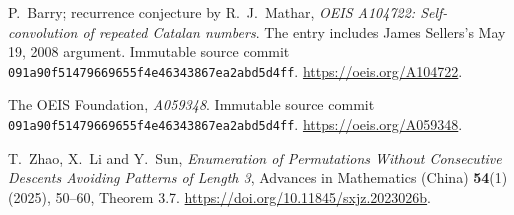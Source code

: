 P.~Barry; recurrence conjecture by R.~J.~Mathar,
\emph{OEIS A104722: Self-convolution of repeated Catalan numbers}.
The entry includes James Sellers's May 19, 2008 argument.
Immutable source commit
\texttt{091a90f51479669655f4e46343867ea2abd5d4ff}.
\url{https://oeis.org/A104722}.

The OEIS Foundation, \emph{A059348}.
Immutable source commit
\texttt{091a90f51479669655f4e46343867ea2abd5d4ff}.
\url{https://oeis.org/A059348}.

T.~Zhao, X.~Li and Y.~Sun,
\emph{Enumeration of Permutations Without Consecutive Descents
Avoiding Patterns of Length 3},
Advances in Mathematics (China) \textbf{54}(1) (2025), 50--60,
Theorem 3.7. \url{https://doi.org/10.11845/sxjz.2023026b}.
